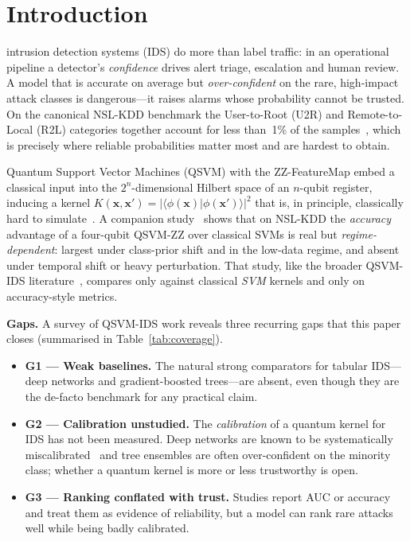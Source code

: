 \documentclass[journal]{IEEEtran}
\newcommand{\ZZ}{\textsc{ZZ}}
\newcommand{\QSVM}{QSVM-\ZZ}
\begin{document}
\section{Introduction}
 intrusion detection systems (IDS) do more than
label traffic: in an operational pipeline a detector's \emph{confidence}
drives alert triage, escalation and human review. A model that is
accurate on average but \emph{over-confident} on the rare, high-impact
attack classes is dangerous---it raises alarms whose probability cannot
be trusted. On the canonical NSL-KDD benchmark the User-to-Root (U2R) and
Remote-to-Local (R2L) categories together account for less than~1\% of
the samples~\cite{tavallaee2009nslkdd}, which is precisely where reliable
probabilities matter most and are hardest to obtain.

Quantum Support Vector Machines (QSVM) with the \ZZ{}-FeatureMap embed a
classical input into the $2^{n}$-dimensional Hilbert space of an
$n$-qubit register, inducing a kernel $K(\mathbf{x},\mathbf{x}')=
|\langle\phi(\mathbf{x})|\phi(\mathbf{x}')\rangle|^2$ that is, in
principle, classically hard to
simulate~\cite{havlicek2019,schuld2019hilbert,liu2021speedup}. A
companion study~\cite{companion} shows that on NSL-KDD the \emph{accuracy}
advantage of a four-qubit \QSVM{} over classical SVMs is real but
\emph{regime-dependent}: largest under class-prior shift and in the
low-data regime, and absent under temporal shift or heavy perturbation.
That study, like the broader QSVM-IDS
literature~\cite{kalinin2023qids,suryotrisongko2022dga,payares2021dos},
compares only against classical \emph{SVM} kernels and only on
accuracy-style metrics.

\textbf{Gaps.} A survey of QSVM-IDS work reveals three recurring gaps
that this paper closes (summarised in Table~\ref{tab:coverage}).
\begin{itemize}
\item \textbf{G1 --- Weak baselines.} The natural strong comparators for
  tabular IDS---deep networks and gradient-boosted trees---are absent,
  even though they are the de-facto benchmark for any practical claim.
\item \textbf{G2 --- Calibration unstudied.} The \emph{calibration} of a
  quantum kernel for IDS has not been measured. Deep networks are known
  to be systematically miscalibrated~\cite{guo2017calibration} and tree
  ensembles are often over-confident on the minority class; whether a
  quantum kernel is more or less trustworthy is open.
\item \textbf{G3 --- Ranking conflated with trust.} Studies report AUC
  or accuracy and treat them as evidence of reliability, but a model can
  rank rare attacks well while being badly calibrated.
\end{itemize}
\end{document}
